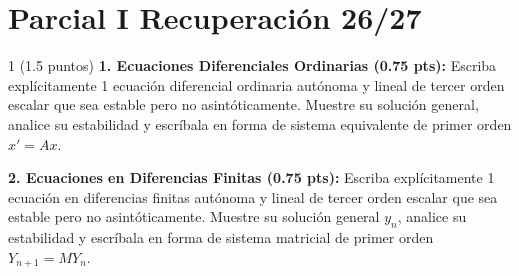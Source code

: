 \chapter{Parcial I Recuperaci\'on 26/27}
\begin{ejer}{1 (1.5 puntos)}
\textbf{1. Ecuaciones Diferenciales Ordinarias (0.75 pts):} Escriba explícitamente 1 ecuación diferencial ordinaria autónoma y lineal de tercer orden escalar que sea estable pero no asintóticamente. Muestre su solución general, analice su estabilidad y escríbala en forma de sistema equivalente de primer orden $x' = Ax$.

\textbf{2. Ecuaciones en Diferencias Finitas (0.75 pts):} Escriba explícitamente 1 ecuación en diferencias finitas autónoma y lineal de tercer orden escalar que sea estable pero no asintóticamente. Muestre su solución general $y_n$, analice su estabilidad y escríbala en forma de sistema matricial de primer orden $Y_{n+1} = MY_n$.
\end{ejer}


